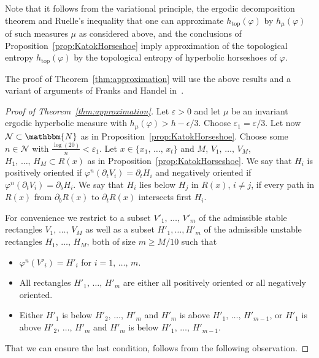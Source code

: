 \documentclass[AHL,Unicode,longabstracts,published]{cedram}
\newcommand{\N}{\mathbbm{N}}
\newcommand{\topo}{\mathrm{top}}
\newcommand{\clN}{\mathcal{N}}
\newcommand{\topo}{\mathrm{top}}
\begin{document}
Note that it follows from the variational principle, the ergodic decomposition theorem and Ruelle's inequality that one can approximate $h_{\topo}(\varphi)$ by $h_{\mu}(\varphi)$ of such measures $\mu$ as considered above, and the conclusions of Proposition~\ref{prop:KatokHorseshoe} imply approximation of the topological entropy $h_{\topo}(\varphi)$ by the topological entropy of hyperbolic horseshoes of $\varphi$.


The proof of Theorem~\ref{thm:approximation} will use the above results and a variant of arguments of Franks and Handel in~\cite{FranksHandel1988}.

\begin{proof}[Proof of Theorem~\ref{thm:approximation}]
Let $\varepsilon>0$ and let $\mu$ be an invariant ergodic hyperbolic measure with $h_{\mu}(\varphi) > h - \epsilon/3$. Choose $\varepsilon_1 = \varepsilon/3$. Let now $\clN\subset \N$ as in Proposition~\ref{prop:KatokHorseshoe}. Choose some $n\in \clN$ with $\frac{ \log(20)}{n} < \varepsilon_1$. Let $x \in \{x_1,\, \ldots,\, x_t\}$ and $M$, $V_1,\, \ldots,\, V_M$, $H_1,\, \ldots,\, H_M \subset R(x)$ as in Proposition~\ref{prop:KatokHorseshoe}. We say that $H_i$ is positively oriented if $\varphi^n(\partial_t V_i) = \partial_t H_i$ and negatively oriented if $\varphi^n(\partial_t V_i) = \partial_b H_i$. We say that $H_i$ lies below $H_j$ in $R(x)$, $i\neq j$, if every path in $R(x)$ from $\partial_b R(x)$ to $\partial_t R(x)$ intersects first $H_i$.


For convenience we restrict to a subset $V'_1,\, \ldots,\, V'_m$ of the admissible stable rectangles $V_1, \,\ldots,\, V_M$ as well as a subset $H'_1, \ldots, H'_m$ of the admissible unstable rectangles \linebreak $H_1,\, \ldots,\, H_M$, both of size $m\geq M/10$ such that
\begin{itemize}
\item $\varphi^n(V'_i) = H'_i$ for $i=1, \,\ldots,\, m$.
\item All rectangles $H'_1,\, \ldots,\, H'_m$ are either all positively oriented or all negatively oriented.
\item Either $H'_1$ is below $H'_2,\, \ldots,\, H'_{m}$ and $H'_m$ is above $H'_1,\, \ldots,\, H'_{m-1}$, or $H'_1$ is above $H'_2, \,\ldots,\, H'_{m}$ and $H'_m$ is below $H'_1, \,\ldots,\, H'_{m-1}$.
\end{itemize}

That we can ensure the last condition, follows from the following observation.


\end{proof}
\end{document}
